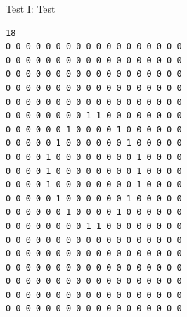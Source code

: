\documentclass[a4paper,12pt,twoside]{article}
\begin{document}
Test I: 
Test 
  \begin{center}
\begin{lstlisting}
18
0 0 0 0 0 0 0 0 0 0 0 0 0 0 0 0 0 0  
0 0 0 0 0 0 0 0 0 0 0 0 0 0 0 0 0 0  
0 0 0 0 0 0 0 0 0 0 0 0 0 0 0 0 0 0  
0 0 0 0 0 0 0 0 0 0 0 0 0 0 0 0 0 0  
0 0 0 0 0 0 0 0 0 0 0 0 0 0 0 0 0 0 
0 0 0 0 0 0 0 0 1 1 0 0 0 0 0 0 0 0  
0 0 0 0 0 0 1 0 0 0 0 1 0 0 0 0 0 0 
0 0 0 0 0 1 0 0 0 0 0 0 1 0 0 0 0 0
0 0 0 0 1 0 0 0 0 0 0 0 0 1 0 0 0 0  
0 0 0 0 1 0 0 0 0 0 0 0 0 1 0 0 0 0  
0 0 0 0 1 0 0 0 0 0 0 0 0 1 0 0 0 0  
0 0 0 0 0 1 0 0 0 0 0 0 1 0 0 0 0 0  
0 0 0 0 0 0 1 0 0 0 0 1 0 0 0 0 0 0  
0 0 0 0 0 0 0 0 1 1 0 0 0 0 0 0 0 0  
0 0 0 0 0 0 0 0 0 0 0 0 0 0 0 0 0 0 
0 0 0 0 0 0 0 0 0 0 0 0 0 0 0 0 0 0 
0 0 0 0 0 0 0 0 0 0 0 0 0 0 0 0 0 0 
0 0 0 0 0 0 0 0 0 0 0 0 0 0 0 0 0 0 
0 0 0 0 0 0 0 0 0 0 0 0 0 0 0 0 0 0
0 0 0 0 0 0 0 0 0 0 0 0 0 0 0 0 0 0

\end{lstlisting}
  \end{center}
\end{document}
